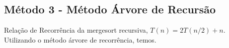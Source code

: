 \subsection{Método 3 - Método Árvore de Recursão}
Relação de Recorrência da mergesort recursiva, $T(n) = 2T(n/2) + n$. Utilizando o método árvore de recorrência, temos.